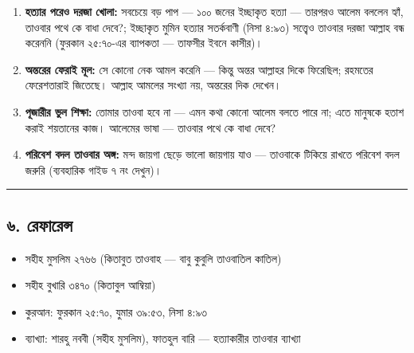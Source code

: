 \begin{enumerate}
\item \textbf{হত্যার পরেও দরজা খোলা:} সবচেয়ে বড় পাপ — ১০০ জনের ইচ্ছাকৃত হত্যা — তারপরও আলেম বললেন হ্যাঁ, তাওবার পথে কে বাধা দেবে?; ইচ্ছাকৃত মুমিন হত্যার সতর্কবাণী (নিসা ৪:৯৩) সত্ত্বেও তাওবার দরজা আল্লাহ বন্ধ করেননি (ফুরকান ২৫:৭০-এর ব্যাপকতা — তাফসীর ইবনে কাসীর)।
\item \textbf{অন্তরের ফেরাই মূল:} সে কোনো নেক আমল করেনি — কিন্তু অন্তর আল্লাহর দিকে ফিরেছিল; রহমতের ফেরেশতারাই জিতেছে। আল্লাহ আমলের সংখ্যা নয়, অন্তরের দিক দেখেন।
\item \textbf{পূজারীর ভুল শিক্ষা:} তোমার তাওবা হবে না — এমন কথা কোনো আলেম বলতে পারে না; এতে মানুষকে হতাশ করাই শয়তানের কাজ। আলেমের ভাষা — তাওবার পথে কে বাধা দেবে?
\item \textbf{পরিবেশ বদল তাওবার অঙ্গ:} মন্দ জায়গা ছেড়ে ভালো জায়গায় যাও — তাওবাকে টিকিয়ে রাখতে পরিবেশ বদল জরুরি (ব্যবহারিক গাইড ৭ নং দেখুন)।
\end{enumerate}
\medskip\hrule\medskip

\subsection*{৬. রেফারেন্স}

\begin{itemize}
\item সহীহ মুসলিম ২৭৬৬ (কিতাবুত তাওবাহ — বাবু কুবুলি তাওবাতিল কাতিল)
\item সহীহ বুখারি ৩৪৭০ (কিতাবুল আম্বিয়া)
\item কুরআন: ফুরকান ২৫:৭০, যুমার ৩৯:৫৩, নিসা ৪:৯৩
\item ব্যাখ্যা: শারহু নববী (সহীহ মুসলিম), ফাতহুল বারি — হত্যাকারীর তাওবার ব্যাখ্যা
\end{itemize}



